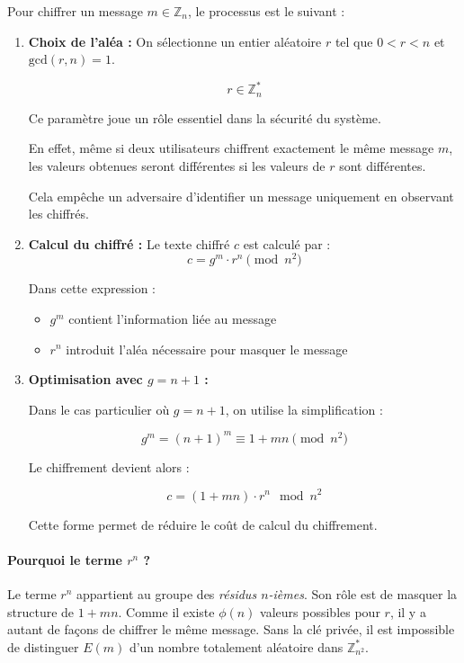 \documentclass[12pt,a4paper]{report}
\begin{document}
Pour chiffrer un message $m \in \mathbb{Z}_n$, le processus est le suivant :
\begin{enumerate}
    \item \textbf{Choix de l'aléa :} On sélectionne un entier aléatoire $r$ tel que $0 < r < n$ et $\text{gcd}(r, n) = 1$.

    
\[
r \in \mathbb{Z}_n^*
\]

Ce paramètre joue un rôle essentiel dans la sécurité du système.

En effet, même si deux utilisateurs chiffrent exactement le même message $m$,
les valeurs obtenues seront différentes si les valeurs de $r$ sont différentes.

Cela empêche un adversaire d'identifier un message uniquement en observant les
chiffrés.
    \item \textbf{Calcul du chiffré :} Le texte chiffré $c$ est calculé par :
    \[ c = g^m \cdot r^n \pmod{n^2} \]


Dans cette expression :

\begin{itemize}

\item $g^m$ contient l'information liée au message

\item $r^n$ introduit l'aléa nécessaire pour masquer le message

\end{itemize}

    \item \textbf{Optimisation avec $g = n+1$ :} 

    
Dans le cas particulier où $g = n+1$, on utilise la simplification :

\[
g^m = (n+1)^m \equiv 1 + mn \pmod{n^2}
\]

Le chiffrement devient alors :

\[
c = (1 + mn) \cdot r^n \mod n^2
\]

Cette forme permet de réduire le coût de calcul du chiffrement.


\end{enumerate}

\paragraph{Pourquoi le terme $r^n$ ?} 
Le terme $r^n$ appartient au groupe des \textit{résidus $n$-ièmes}. Son rôle est de masquer la structure de $1+mn$. Comme il existe $\phi(n)$ valeurs possibles pour $r$, il y a autant de façons de chiffrer le même message. Sans la clé privée, il est impossible de distinguer $E(m)$ d'un nombre totalement aléatoire dans $\mathbb{Z}_{n^2}^*$.
\end{document}
